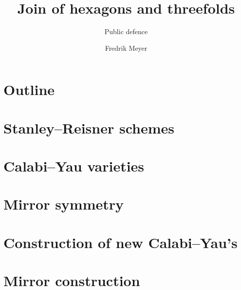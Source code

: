 \documentclass[UKenglish]{beamer}
\title{Join of hexagons and \texorpdfstring{\CY}{Calabi--Yau} threefolds}
\subtitle{Public defence}
\author{Fredrik Meyer}
\begin{document}
\section{Outline}


\section{Stanley--Reisner schemes}


\section{Calabi--Yau varieties}



\section{Mirror symmetry}



\section{Construction of new Calabi--Yau's}



\section{Mirror construction}


\end{document}
